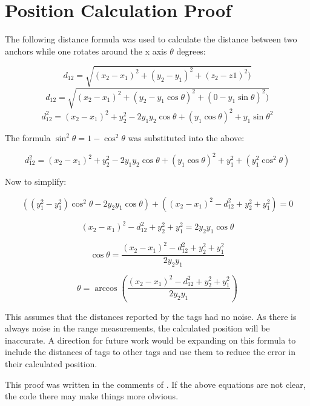 \chapter{Position Calculation Proof}
\label{PositionCalculationProof}

The following distance formula was used to calculate the distance between two anchors while one rotates around the x axis $\theta$ degrees:

\[ d_{12} = \sqrt{(x_{2} - x_{1})^{2} + (y_{2} - y_{1})^2 + (z_{2} - z{1})^2)} \]
\[ d_{12} = \sqrt{(x_{2} - x_{1})^{2} + (y_{2} - y_{1}\cos\theta)^2 + (0 - y_{1}\sin\theta)^2)} \]
\[ d_12^{2} = (x_{2} - x_{1})^{2} + y_{2}^{2} - 2y_{1}y_{2}\cos\theta + (y_{1}\cos\theta)^{2} + y_{1}\sin\theta^{2} \]

The formula $\sin^{2}\theta = 1 - \cos^{2}\theta$ was substituted into the above:

\[ d_{12}^{2} = (x_{2} - x_{1})^{2} + y_{2}^{2} - 2y_{1}y_{2}\cos\theta + (y_{1}\cos\theta)^{2} + y_{1}^2 + (y_{1}^{2}\cos^{2}\theta) \]

Now to simplify:

\[((y_{1}^2 - y_{1}^{2}) \cos^{2}\theta - 2y_{2}y_{1}\cos\theta) + ((x_{2} - x_{1})^{2} - d_{12}^{2} + y_{2}^{2} + y_{1}^{2}) = 0 \]

 \[ (x_{2} - x_{1})^{2} - d_{12}^{2} + y_{2}^{2} + y_{1}^{2} =  2y_{2}y_{1}\cos\theta \]

\[ \cos\theta = \frac{(x_{2} - x_{1})^{2} - d_{12}^{2} + y_{2}^{2} + y_{1}^{2}}{2y_{2}y_{1}} \]

\[ \theta = \arccos(\frac{(x_{2} - x_{1})^{2} - d_{12}^{2} + y_{2}^{2} + y_{1}^{2}}{2y_{2}y_{1}}) \]

This assumes that the distances reported by the tags had no noise. As there is always noise in the range measurements, the calculated position will be inaccurate. A direction for future work would be expanding on this formula to include the distances of tags to other tags and use them to reduce the error in their calculated position.

This proof was written in the comments of . If the above equations are not clear, the code there may make things more obvious.